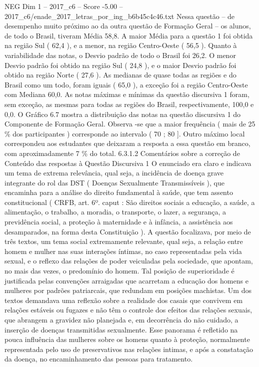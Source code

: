 \begin{textsample}{NEG Dim 1 – 2017\_c6 – Score -5.00 – 2017\_c6/enade\_2017\_letras\_por\_ing\_b6b45c4c46.txt}
Nessa questão – de desempenho muito próximo ao da outra questão de Formação Geral – os alunos, de todo o Brasil, tiveram Média 58,8.
A maior Média para a questão 1 foi obtida na região Sul ( 62,4 ), e a menor, na região Centro-Oeste ( 56,5 ).
Quanto à variabilidade das notas, o Desvio padrão de todo o Brasil foi 26,2.
O menor Desvio padrão foi obtido na região Sul ( 24,8 ), e o maior Desvio padrão foi obtido na região Norte ( 27,6 ).
As medianas de quase todas as regiões e do Brasil como um todo, foram iguais ( 65,0 ), a exceção foi a região Centro-Oeste com Mediana 60,0.
As notas máximas e mínimas da questão discursiva 1 foram, sem exceção, as mesmas para todas as regiões do Brasil, respectivamente, 100,0 e 0,0.
O Gráfico 6.7 mostra a distribuição das notas na questão discursiva 1 do Componente de Formação Geral.
Observa -se que a maior frequência ( mais de 25 \% dos participantes ) corresponde ao intervalo ( 70 ; 80 ].
Outro máximo local correspondeu aos estudantes que deixaram a resposta a essa questão em branco, com aproximadamente 7 \% do total. 6.3.1.2 Comentários sobre a correção de Conteúdo das respostas à Questão Discursiva 1 O enunciado era claro e indicava um tema de extrema relevância, qual seja, a incidência de doença grave integrante do rol das DST ( Doenças Sexualmente Transmissíveis ), que encaminha para a análise do direito fundamental à saúde, que tem assento constitucional ( CRFB, art. 6º. caput : São direitos sociais a educação, a saúde, a alimentação, o trabalho, a moradia, o transporte, o lazer, a segurança, a previdência social, a proteção à maternidade e à infância, a assistência aos desamparados, na forma desta Constituição ).
A questão focalizava, por meio de três textos, um tema social extremamente relevante, qual seja, a relação entre homem e mulher nas suas interações íntimas, no caso representadas pela vida sexual, e o reflexo das relações de poder veiculadas pela sociedade, que apontam, no mais das vezes, o predomínio do homem.
Tal posição de superioridade é justificada pelas convenções arraigadas que acarretam a educação dos homens e mulheres por padrões patriarcais, que redundam em posições machistas.
Um dos textos demandava uma reflexão sobre a realidade dos casais que convivem em relações estáveis ou fugazes e não têm o controle dos efeitos das relações sexuais, que abrangem a gravidez não planejada e, em decorrência do não cuidado, a inserção de doenças transmitidas sexualmente.
Esse panorama é refletido na pouca influência das mulheres sobre os homens quanto à proteção, normalmente representada pelo uso de preservativos nas relações intimas, e após a constatação da doença, no encaminhamento das pessoas para tratamento.

\end{textsample}
